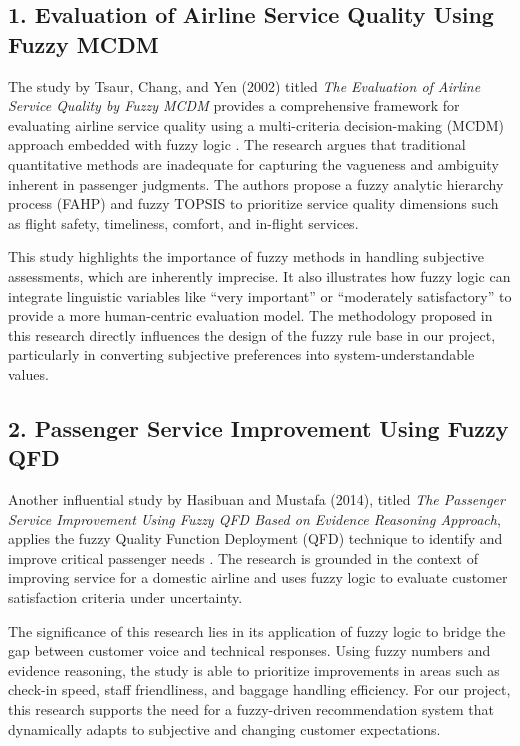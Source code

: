 \documentclass[a4paper]{article}
\begin{document}
\subsection*{1. Evaluation of Airline Service Quality Using Fuzzy MCDM}

The study by Tsaur, Chang, and Yen (2002) titled \textit{The Evaluation of Airline Service Quality by Fuzzy MCDM} provides a comprehensive framework for evaluating airline service quality using a multi-criteria decision-making (MCDM) approach embedded with fuzzy logic \cite{tsaur2002evaluation}. The research argues that traditional quantitative methods are inadequate for capturing the vagueness and ambiguity inherent in passenger judgments. The authors propose a fuzzy analytic hierarchy process (FAHP) and fuzzy TOPSIS to prioritize service quality dimensions such as flight safety, timeliness, comfort, and in-flight services.

This study highlights the importance of fuzzy methods in handling subjective assessments, which are inherently imprecise. It also illustrates how fuzzy logic can integrate linguistic variables like “very important” or “moderately satisfactory” to provide a more human-centric evaluation model. The methodology proposed in this research directly influences the design of the fuzzy rule base in our project, particularly in converting subjective preferences into system-understandable values.

\subsection*{2. Passenger Service Improvement Using Fuzzy QFD}

Another influential study by Hasibuan and Mustafa (2014), titled \textit{The Passenger Service Improvement Using Fuzzy QFD Based on Evidence Reasoning Approach}, applies the fuzzy Quality Function Deployment (QFD) technique to identify and improve critical passenger needs \cite{hasibuan2014passenger}. The research is grounded in the context of improving service for a domestic airline and uses fuzzy logic to evaluate customer satisfaction criteria under uncertainty.

The significance of this research lies in its application of fuzzy logic to bridge the gap between customer voice and technical responses. Using fuzzy numbers and evidence reasoning, the study is able to prioritize improvements in areas such as check-in speed, staff friendliness, and baggage handling efficiency. For our project, this research supports the need for a fuzzy-driven recommendation system that dynamically adapts to subjective and changing customer expectations.
\end{document}
